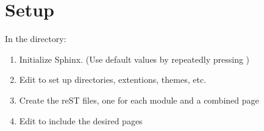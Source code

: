 \documentclass[letterpaper,10pt,english]{sphinxmanual}
\begin{document}
\section{Setup}
\label{\detokenize{ressources:setup}}
\begin{sphinxVerbatim}[commandchars=\\\{\}]
  
  
\end{sphinxVerbatim}

\sphinxAtStartPar
In the  directory:
\begin{enumerate}
%
\item {} 
\sphinxAtStartPar
Initialize Sphinx. (Use default values by repeatedly pressing )

\begin{sphinxVerbatim}[commandchars=\\\{\}]
\end{sphinxVerbatim}

\item {} 
\sphinxAtStartPar
Edit  to set up directories, extentions, themes, etc.

\item {} 
\sphinxAtStartPar
Create the reST files, one for each module and a combined page 

\begin{sphinxVerbatim}[commandchars=\\\{\}]
   
\end{sphinxVerbatim}

\item {} 
\sphinxAtStartPar
Edit  to include the desired pages

\end{enumerate}
\end{document}
